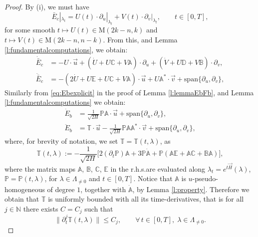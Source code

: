 \documentclass[11pt,a4paper]{article}
\theoremstyle{plain}
\theoremstyle{definition}
\theoremstyle{remark}
\numberwithin{equation}{section}
\newcommand{\N}{\mathbb{N}} %
\newcommand{\A}{\mathbb{A}}
\newcommand{\B}{\mathbb{B}}
\newcommand{\C}{\mathbb{C}}
\newcommand{\D}{\mathbb{D}}
\newcommand{\E}{\mathbb{E}}
\renewcommand{\P}{\mathbb{P}}
\begin{document}
\begin{proof}
By (i), we must have
\begin{equation}\label{eq:ansatzEc}
\bar{E}_c|_{\lambda_t}= U(t)\cdot\partial_u|_{\lambda_t} + V(t)\cdot \partial_v|_{\lambda_t}, \qquad t\in [0,T],
\end{equation}
for some smooth $t\mapsto U(t) \in \mathrm{M}(2k-n,k)$ and $t\mapsto V(t)\in \mathrm{M}(2k-n,n-k)$. From this, and Lemma \ref{l:fundamentalcomputations}, we obtain:
\begin{align}
\dot{\bar{E}}_c &  = -U\cdot \vec{u}+(\dot{U} + U\C + V\A)\cdot \partial_u + (\dot{V} + U\D + V\B)\cdot\partial_v, \\
\ddot{\bar{E}}_c & =  -(2\dot{U} + U\E +  U\C + V\A)\cdot \vec{u} +U\A^* \cdot \vec{v} + \mathrm{span}\{\partial_u,\partial_v\}, 
\end{align}
Similarly from \eqref{eq:Ebexplicit} in the proof of Lemma \ref{l:lemmaEbFb}, and Lemma \ref{l:fundamentalcomputations} we obtain:
\begin{align}
\dot{E}_b & = \frac{1}{\sqrt{2H}}\P\A \cdot \vec{u} + \mathrm{span}\{\partial_u,\partial_v\},\\
\ddot{E}_b & = \mathbb{T}\cdot\vec{u} - \frac{1}{\sqrt{2H}} \P\A\A^* \cdot\vec{v} + \mathrm{span}\{\partial_u,\partial_v\},
\end{align}
where, for brevity of notation, we set $\mathbb{T} = \mathbb{T}(t,\lambda)$, as
\begin{equation}\label{eq:defT}
\mathbb{T}(t,\lambda):= - \frac{1}{\sqrt{2H}}\Big[2(\partial_t\P)\A + 3\P\dot{\A}+\P(\A\E+\A\C+\B\A) \Big],
\end{equation}
where the matrix maps $\A$, $\B$, $\C$, $\E$ in the r.h.s.\@ are evaluated along $\lambda_t = e^{t\vec{H}}(\lambda)$, $\P = \P(t,\lambda)$, for $\lambda \in \Lambda_{\neq 0}$ and $t\in [0,T]$. Notice that $\A$ is $u$-pseudo-homogeneous of degree $1$, together with $\dot{\A}$, by Lemma \ref{l:property}. Therefore we obtain that $\mathbb{T}$ is uniformly bounded with all its time-derivatives, that is for all $j\in \N$ there exists $C = C_j$ such that
\begin{equation}
\|\partial_t^{j}\mathbb{T}(t,\lambda)\|\leq C_j,\qquad \forall\, t\in [0,T],\; \lambda \in \Lambda_{\neq 0}.
\end{equation}


\end{proof}
\end{document}
